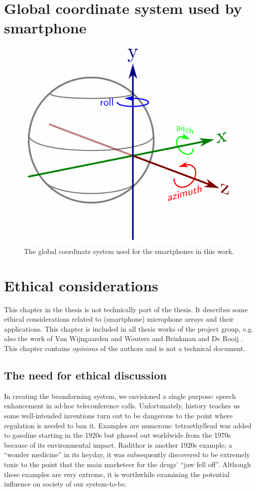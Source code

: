 \documentclass[a4paper, notitlepage]{report}
\begin{document}
\chapter{Global coordinate system used by smartphone}

\begin{figure}[ht]
\centering
\includegraphics{figures/orientation/coordinate_system}
\caption[Global coordinate system for smartphones.]{The global coordinate system used for the smartphones in this work.}
\label{app:coordinate_system}
\end{figure}

\chapter{Ethical considerations}
This chapter in the thesis is not technically part of the thesis. It describes some ethical considerations related to (smartphone) microphone arrays and their applications. This chapter is included in all thesis works of the project group, e.g. also the work of Van Wijngaarden and Wouters \cite{BAP:ErikNiels} and Brinkman and De Rooij \cite{BAP:RosalieTim}. This chapter contains \emph{opinions} of the authors and is not a technical document.

\section*{The need for ethical discussion}
In creating the beamforming system, we envisioned a single purpose: speech enhancement in ad-hoc teleconference calls. Unfortunately, history teaches us some well-intended inventions turn out to be dangerous to the point where regulation is needed to ban it. Examples are numerous: tetraethyllead was added to gasoline starting in the 1920s but phased out worldwide from the 1970s because of its environmental impact. Radithor is another 1920s example; a ``wonder medicine'' in its heyday, it was subsequently discovered to be extremely toxic to the point that the main marketeer for the drugs' ``jaw fell off''.
Although these examples are very extreme, it is worthwhile examining the potential influence on society of our system-to-be.
\end{document}
